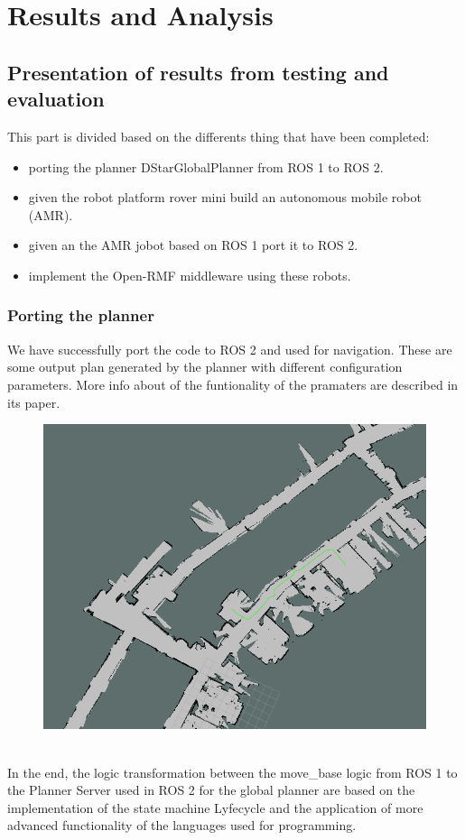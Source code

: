 
\part{Results and Analysis}

\chapter{Presentation of results from testing and evaluation}
This part is divided based on the differents thing that have been completed:
\begin{itemize}
	\item porting the planner DStarGlobalPlanner from ROS 1 to ROS 2.
	\item given the robot platform rover mini build an autonomous mobile robot (AMR).
	\item given an the AMR jobot based on ROS 1 port it to ROS 2.
	\item implement the Open-RMF middleware using these robots.
\end{itemize}
\section{Porting the planner}
We have successfully port the code to ROS 2 and used for navigation. These are some output plan generated by the planner with different configuration parameters. More info about of the funtionality of the pramaters are described in its paper.
\\
\begin{figure}[h]
	\centering
	\includegraphics[width=0.6\linewidth]{img/Dstar_plan_ufficio_ripostiglio.png}
\end{figure}
\\
In the end, the logic transformation between the move\_base logic from ROS 1 to the Planner Server used in ROS 2 for the global planner are based on the implementation of the state machine Lyfecycle and the application of more advanced functionality of the languages used for programming.
